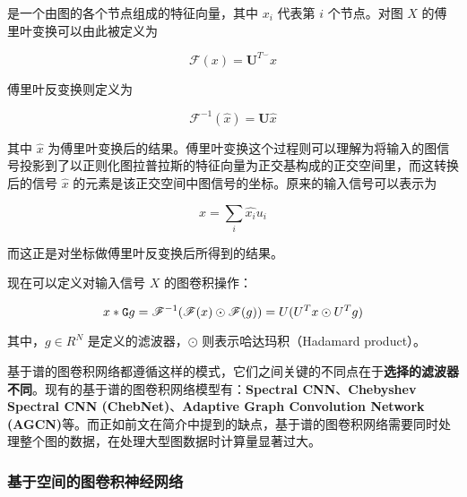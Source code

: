 \documentclass[UTF8]{ctexart}
\begin{document}
是一个由图的各个节点组成的特征向量，其中 $x_i$ 代表第 $i$ 个节点。对图 $X$ 的傅里叶变换可以由此被定义为

\begin{equation} 
\mathscr{F}(x)=\mathbf{U}^{T^{\smile}}x
\end{equation}

傅里叶反变换则定义为

\begin{equation} 
\mathscr{F}^{-1}(\widehat{x})=\mathbf{U}\widehat{x}
\end{equation}

其中 $\widehat{x}$ 为傅里叶变换后的结果。傅里叶变换这个过程则可以理解为将输入的图信号投影到了以正则化图拉普拉斯的特征向量为正交基构成的正交空间里，而这转换后的信号 $\widehat{x}$ 的元素是该正交空间中图信号的坐标。原来的输入信号可以表示为

\begin{equation} 
x=\sum_{i}\widehat{x_i}u_i
\end{equation}

而这正是对坐标做傅里叶反变换后所得到的结果。\par

现在可以定义对输入信号 $X$ 的图卷积操作：

\begin{equation} 
x * \mathtt{G} g = \mathscr{F}^{-1}(\mathscr{F}(x) \odot \mathscr{F}(g)) \\
= U(U^{T} x \odot U^{T} g)
\end{equation}

其中，$g \in R^N$ 是定义的滤波器，$\odot$ 则表示哈达玛积（Hadamard product）。\par

基于谱的图卷积网络都遵循这样的模式，它们之间关键的不同点在于\textbf{选择的滤波器不同}。现有的基于谱的图卷积网络模型有：\textbf{Spectral CNN}、\textbf{Chebyshev Spectral CNN (ChebNet)}、\textbf{Adaptive Graph Convolution Network (AGCN)}等。而正如前文在简介中提到的缺点，基于谱的图卷积网络需要同时处理整个图的数据，在处理大型图数据时计算量显著过大。

\subsubsection{基于空间的图卷积神经网络}
\end{document}
